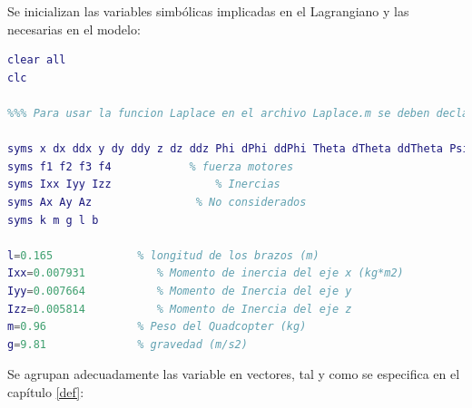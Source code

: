 \documentclass[twoside,11pt]{report}
\begin{document}
Se inicializan las variables simbólicas implicadas en el Lagrangiano y las necesarias en el modelo:

\singlespacing
\begin{lstlisting}[language=Matlab]
clear all
clc

%%% Para usar la funcion Laplace en el archivo Laplace.m se deben declarar las variables de esta manera:

syms x dx ddx y dy ddy z dz ddz Phi dPhi ddPhi Theta dTheta ddTheta Psi dPsi ddPsi
syms f1 f2 f3 f4 		    % fuerza motores
syms Ixx Iyy Izz				% Inercias
syms Ax Ay Az                % No considerados
syms k m g l b

l=0.165             % longitud de los brazos (m)
Ixx=0.007931           % Momento de inercia del eje x (kg*m2) 
Iyy=0.007664           % Momento de Inercia del eje y
Izz=0.005814           % Momento de Inercia del eje z
m=0.96              % Peso del Quadcopter (kg)
g=9.81              % gravedad (m/s2)
\end{lstlisting}

Se agrupan adecuadamente las variable en vectores, tal y como se especifica en el capítulo \ref{def}:
\end{document}
